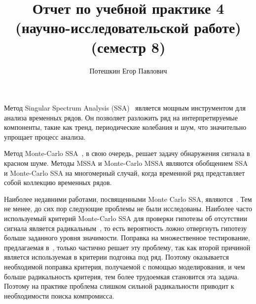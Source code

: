 \documentclass[specialist,
substylefile = spbu_report.rtx,
subf,href,colorlinks=true, 12pt]{disser}
\theoremstyle{definition}
\begin{document}
\setcounter{tocdepth}{2}
%
%

\title{Отчет по учебной практике 4 (научно-исследовательской работе) (семестр 8)}


\author{Потешкин Егор Павлович}


\date{\number\year}

\maketitle
\tableofcontents
\intro
Метод Singular Spectrum Analysis (SSA)~\cite{SSA_broom,Golyandina2001} является мощным инструментом для анализа временных рядов. Он позволяет разложить ряд на интерпретируемые компоненты, такие как тренд, периодические колебания и шум, что значительно упрощает процесс анализа. 
 
 Метод Monte-Carlo SSA~\cite{Allen}, в свою очередь, решает задачу обнаружения сигнала в красном шуме. Методы MSSA и Monte-Carlo MSSA являются обобщением SSA и Monte-Carlo SSA на многомерный случай, когда временной ряд представляет собой коллекцию временных рядов.
 
 Наиболее недавними работами, посвященными Monte Carlo SSA, являются~\cite{Boiarov2012,Groth2015,Golyandina_2023,Larin_2022}. 
  Тем не менее, до сих пор следующие проблемы не были исследованы. Наиболее часто используемый критерий Monte-Carlo SSA для проверки гипотезы об отсутствии сигнала является радикальным~\cite{NAO,Enchanced_mcssa,Golyandina_2023}, то есть вероятность ложно отвергнуть гипотезу больше заданного уровня значимости. Поправка на множественное тестирование, предлагаемая в~\cite{Golyandina_2023}, только частично решает эту проблему, так как второй причиной является используемая в критерии подгонка под ряд. Поэтому оказывается необходимой поправка критерия, получаемой с помощью моделирования, и чем больше радикальность критерия, тем более трудоемкая становится эта задача. Поэтому на практике проблема слишком сильной радикальности приводит к необходимости поиска компромисса. 
  
\end{document}
